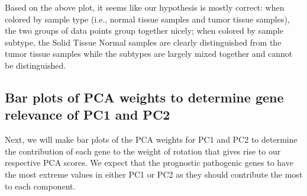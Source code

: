 \documentclass[
]{article}
\newenvironment{Shaded}{\begin{snugshade}}{\end{snugshade}}
\newcommand{\AttributeTok}[1]{\textcolor[rgb]{0.77,0.63,0.00}{#1}}
\newcommand{\CommentTok}[1]{\textcolor[rgb]{0.56,0.35,0.01}{\textit{#1}}}
\newcommand{\DecValTok}[1]{\textcolor[rgb]{0.00,0.00,0.81}{#1}}
\newcommand{\FunctionTok}[1]{\textcolor[rgb]{0.00,0.00,0.00}{#1}}
\newcommand{\NormalTok}[1]{#1}
\newcommand{\SpecialCharTok}[1]{\textcolor[rgb]{0.00,0.00,0.00}{#1}}
\newcommand{\StringTok}[1]{\textcolor[rgb]{0.31,0.60,0.02}{#1}}
\begin{document}
Based on the above plot, it seems like our hypothesis is mostly correct:
when colored by sample type (i.e., normal tissue samples and tumor
tissue samples), the two groups of data points group together nicely;
when colored by sample subtype, the Solid Tissue Normal samples are
clearly distinguished from the tumor tissue samples while the subtypes
are largely mixed together and cannot be distinguished.

\newpage

\hypertarget{bar-plots-of-pca-weights-to-determine-gene-relevance-of-pc1-and-pc2}{%
\subsection{Bar plots of PCA weights to determine gene relevance of PC1
and
PC2}\label{bar-plots-of-pca-weights-to-determine-gene-relevance-of-pc1-and-pc2}}

Next, we will make bar plots of the PCA weights for PC1 and PC2 to
determine the contribution of each gene to the weight of rotation that
gives rise to our respective PCA scores. We expect that the prognostic
pathogenic genes to have the most extreme values in either PC1 or PC2 as
they should contribute the most to each component.

\begin{Shaded}
\end{Shaded}
\end{document}
